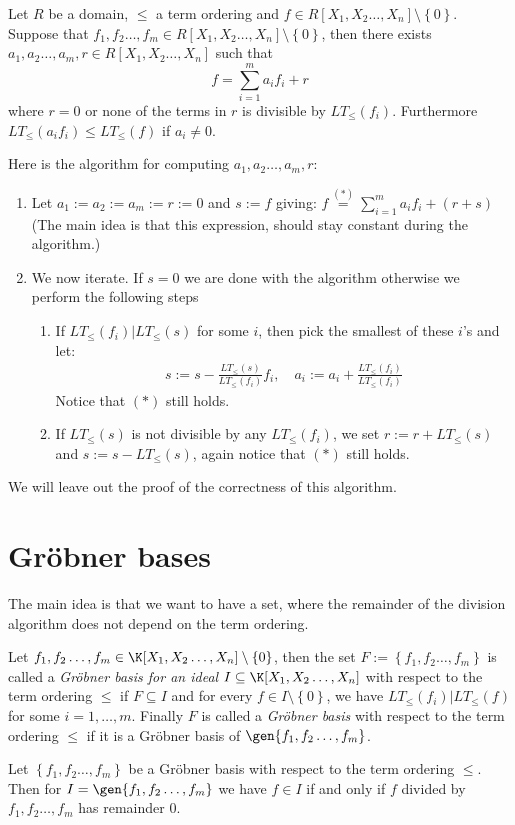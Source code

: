 \begin{proposition}\label{prop:division_algorithm}
  Let $R$ be a domain, $\leq$ a term ordering and $f \in R[X_1, X_2 \ldots, X_{n}] \setminus \left\{0\right\}$. Suppose that $f_1, f_2 \ldots, f_{m} \in R[X_1, X_2 \ldots, X_{n}] \setminus \left\{0\right\}$, then there exists $a_1, a_2 \ldots, a_{m} , r \in R[X_1, X_2 \ldots, X_{n}]$ such that
  \begin{equation*}
    f = \sum_{i = 1}^m a_i f_i + r
  \end{equation*}
  where $r = 0$ or none of the terms in $r$ is divisible by $LT_{\leq}(f_{i})$. Furthermore $LT_{\leq}(a_if_i) \leq LT_{\leq}(f)$ if $a_i \neq 0$.
\end{proposition}
Here is the algorithm for computing $a_1, a_2 \ldots, a_{m}, r$:
\begin{enumerate}
  \item Let $a_1 := a_2 := a_m := r := 0$ and $s := f$ giving: $f \stackrel{(*)}{=} \sum_{i = 1}^m a_i f_i + (r + s)$ (The main idea is that this expression, should stay constant during the algorithm.)
  \item We now iterate. If $s = 0$ we are done with the algorithm otherwise we perform the following steps
  \begin{enumerate}
    \item If $LT_{\leq}(f_{i}) | LT_{\leq} (s)$ for some $i$, then pick the smallest of these $i$'s and let:
\begin{align*}
  s := s - \frac{LT_{\leq}(s)}{LT_{\leq}(f_{i})} f_{i}, \quad
  a_{i} := a_{i} + \frac{LT_{\leq}(f_{i})}{LT_{\leq}(f_{i})}
\end{align*}
    Notice that $(*)$ still holds.
    \item If $LT_{\leq}(s)$ is not divisible by any $LT_{\leq}(f_{i})$, we set $r := r + LT_{\leq}(s)$ and $s := s - LT_{\leq}(s)$, again notice that $(*)$ still holds.
  \end{enumerate}
\end{enumerate}
We will leave out the proof of the correctness of this algorithm.
\section{Gröbner bases}%
\label{sec:gröbner}
The main idea is that we want to have a set, where the remainder of the division algorithm does not depend on the term ordering.

\begin{definition}
  Let $f_1, f_2 \ldots, f_{m} \in \K[X_1, X_2 \ldots, X_{n}] \setminus \left\{0\right\}$, then the set $F := \left\{f_1, f_2 \ldots, f_{m}\right\}$ is called a \textit{Gröbner basis for an ideal} $I \subseteq \K[X_1, X_2 \ldots, X_{n}]$ with respect to the term ordering $\leq$ if $F \subseteq I$ and for every $f \in I \setminus \left\{0\right\}$, we have $LT_{\leq}(f_{i}) | LT_{\leq}(f)$ for some $i = 1, \ldots, m$. Finally $F$ is called a \textit{Gröbner basis} with respect to the term ordering $\leq$ if it is a Gröbner basis of $\gen{f_1, f_2 \ldots, f_{m}}$.
\end{definition}

\begin{proposition}\label{prop:}
  Let $\left\{f_1, f_2 \ldots, f_{m}\right\}$ be a Gröbner basis with respect to the term ordering $\leq$. Then for $I = \gen{f_1, f_2 \ldots, f_{m}}$ we have $f \in I$ if and only if $f$ divided by $f_1, f_2 \ldots, f_{m}$ has remainder $0$.
\end{proposition}
